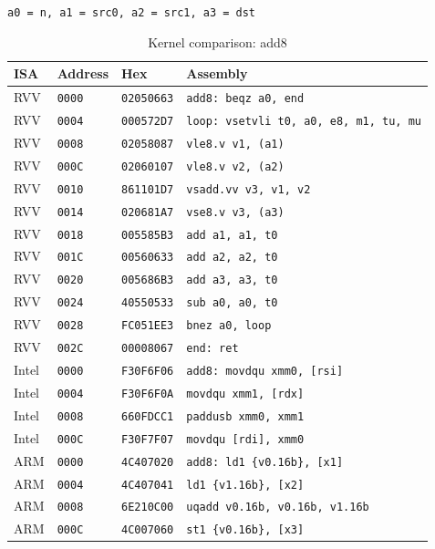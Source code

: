 \begin{table}[htbp]
\centering
\caption{Kernel comparison: add8}
\begingroup
\scriptsize
\setlength{\tabcolsep}{4pt}
\noindent \texttt{a0 = n, a1 = src0, a2 = src1, a3 = dst}\par
\vspace{0.6ex}
\begin{tabular}{@{}l|l|l|p{7.2cm}@{}}
\toprule
ISA & Address & Hex & Assembly \\
\midrule
RVV & \texttt{0000} & \texttt{02050663} & \texttt{add8: beqz a0, end} \\
RVV & \texttt{0004} & \texttt{000572D7} & \texttt{loop: vsetvli t0, a0, e8, m1, tu, mu} \\
RVV & \texttt{0008} & \texttt{02058087} & \texttt{vle8.v v1, (a1)} \\
RVV & \texttt{000C} & \texttt{02060107} & \texttt{vle8.v v2, (a2)} \\
RVV & \texttt{0010} & \texttt{861101D7} & \texttt{vsadd.vv v3, v1, v2} \\
RVV & \texttt{0014} & \texttt{020681A7} & \texttt{vse8.v v3, (a3)} \\
RVV & \texttt{0018} & \texttt{005585B3} & \texttt{add a1, a1, t0} \\
RVV & \texttt{001C} & \texttt{00560633} & \texttt{add a2, a2, t0} \\
RVV & \texttt{0020} & \texttt{005686B3} & \texttt{add a3, a3, t0} \\
RVV & \texttt{0024} & \texttt{40550533} & \texttt{sub a0, a0, t0} \\
RVV & \texttt{0028} & \texttt{FC051EE3} & \texttt{bnez a0, loop} \\
RVV & \texttt{002C} & \texttt{00008067} & \texttt{end: ret} \\
\midrule
Intel & \texttt{0000} & \texttt{F30F6F06} & \texttt{add8: movdqu xmm0, [rsi]} \\
Intel & \texttt{0004} & \texttt{F30F6F0A} & \texttt{movdqu xmm1, [rdx]} \\
Intel & \texttt{0008} & \texttt{660FDCC1} & \texttt{paddusb xmm0, xmm1} \\
Intel & \texttt{000C} & \texttt{F30F7F07} & \texttt{movdqu [rdi], xmm0} \\
\midrule
ARM & \texttt{0000} & \texttt{4C407020} & \texttt{add8: ld1 \{v0.16b\}, [x1]} \\
ARM & \texttt{0004} & \texttt{4C407041} & \texttt{ld1 \{v1.16b\}, [x2]} \\
ARM & \texttt{0008} & \texttt{6E210C00} & \texttt{uqadd v0.16b, v0.16b, v1.16b} \\
ARM & \texttt{000C} & \texttt{4C007060} & \texttt{st1 \{v0.16b\}, [x3]} \\
\bottomrule
\end{tabular}
\endgroup
\end{table}
\noindent{}\par
